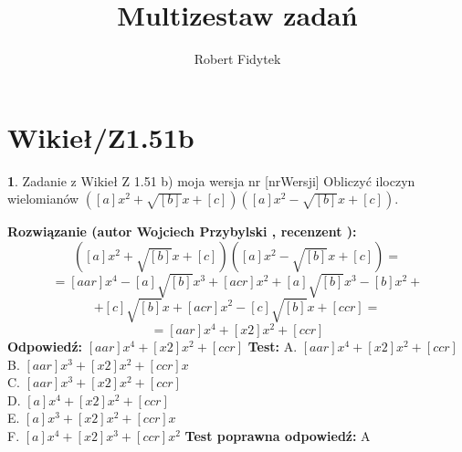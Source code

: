 \documentclass[12pt, a4paper]{article}
\title{Multizestaw zadań}
\author{Robert Fidytek}
\date{}
\theoremstyle{definition} %
\newtheorem{zad}{}
\newcommand{\kategoria}[1]{\section{#1}} %
\newcommand{\zadStart}[1]{\begin{zad}#1\newline} %
\newcommand{\zadStop}{\end{zad}}   %
\newcommand{\rozwStart}[2]{\noindent \textbf{Rozwiązanie (autor #1 , recenzent #2): }\newline} %
\newcommand{\rozwStop}{\newline}                                            %
\newcommand{\odpStart}{\noindent \textbf{Odpowiedź:}\newline}    %
\newcommand{\odpStop}{\newline}                                             %
\newcommand{\testStart}{\noindent \textbf{Test:}\newline} %
\newcommand{\testStop}{\newline} %
\newcommand{\kluczStart}{\noindent \textbf{Test poprawna odpowiedź:}\newline} %
\newcommand{\kluczStop}{\newline} %
\begin{document}
\maketitle


\kategoria{Wikieł/Z1.51b}
\zadStart{Zadanie z Wikieł Z 1.51 b) moja wersja nr [nrWersji]}
Obliczyć iloczyn wielomianów $([a]x^{2}+\sqrt{[b]}x+[c])([a]x^{2}-\sqrt{[b]}x+[c])$.
\zadStop
\rozwStart{Wojciech Przybylski}{}
$$([a]x^{2}+\sqrt{[b]}x+[c])([a]x^{2}-\sqrt{[b]}x+[c])=$$
$$=[aar]x^{4}-[a]\sqrt{[b]}x^{3}+[acr]x^{2}+[a]\sqrt{[b]}x^{3}-[b]x^{2}+$$
$$+[c]\sqrt{[b]}x+[acr]x^{2}-[c]\sqrt{[b]}x+[ccr]=$$
$$=[aar]x^{4}+[x2]x^{2}+[ccr]$$
\rozwStop
\odpStart
$[aar]x^{4}+[x2]x^{2}+[ccr]$
\odpStop
\testStart
A. $[aar]x^{4}+[x2]x^{2}+[ccr]$\\
B. $[aar]x^{3}+[x2]x^{2}+[ccr]x$\\
C. $[aar]x^{3}+[x2]x^{2}+[ccr]$\\
D. $[a]x^{4}+[x2]x^{2}+[ccr]$\\
E. $[a]x^{3}+[x2]x^{2}+[ccr]x$\\
F. $[a]x^{4}+[x2]x^{3}+[ccr]x^{2}$
\testStop
\kluczStart
A
\kluczStop
\end{document}
